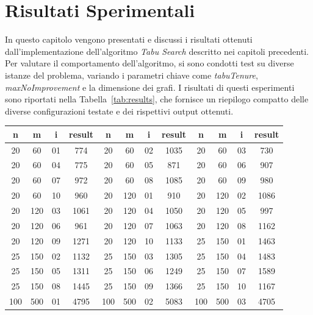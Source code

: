 \section{Risultati Sperimentali}
\label{sec:Risultati}

In questo capitolo vengono presentati e discussi i risultati ottenuti dall'implementazione dell'algoritmo \emph{Tabu Search} descritto nei capitoli precedenti. Per valutare il comportamento dell’algoritmo, si sono condotti test su diverse istanze del problema, variando i parametri chiave come \emph{tabuTenure}, \emph{maxNoImprovement} e la dimensione dei grafi. I risultati di questi esperimenti sono riportati nella Tabella~\ref{tab:results}, che fornisce un riepilogo compatto delle diverse configurazioni testate e dei rispettivi output ottenuti.

\begin{table}[h]
    \centering
    \small
    \renewcommand{\arraystretch}{1.2}
    \begin{tabular}{cccc||cccc||cccc}
        \toprule
        \textbf{n} & \textbf{m} & \textbf{i} & \textbf{result} & \textbf{n} & \textbf{m} & \textbf{i} & \textbf{result} & \textbf{n} & \textbf{m} & \textbf{i} & \textbf{result} \\
        \midrule
        20 & 60  & 01 & 774  & 20 & 60  & 02 & 1035 & 20 & 60  & 03 & 730  \\
        20 & 60  & 04 & 775  & 20 & 60  & 05 & 871  & 20 & 60  & 06 & 907  \\
        20 & 60  & 07 & 972  & 20 & 60  & 08 & 1085 & 20 & 60  & 09 & 980  \\
        20 & 60  & 10 & 960  & 20 & 120 & 01 & 910  & 20 & 120 & 02 & 1086 \\
        20 & 120 & 03 & 1061 & 20 & 120 & 04 & 1050 & 20 & 120 & 05 & 997  \\
        20 & 120 & 06 & 961  & 20 & 120 & 07 & 1063 & 20 & 120 & 08 & 1162 \\
        20 & 120 & 09 & 1271 & 20 & 120 & 10 & 1133 & 25 & 150 & 01 & 1463 \\
        25 & 150 & 02 & 1132 & 25 & 150 & 03 & 1305 & 25 & 150 & 04 & 1483 \\
        25 & 150 & 05 & 1311 & 25 & 150 & 06 & 1249 & 25 & 150 & 07 & 1589 \\
        25 & 150 & 08 & 1445 & 25 & 150 & 09 & 1366 & 25 & 150 & 10 & 1167 \\
        \hline\hline
        100 & 500  & 01 & 4795 & 100 & 500  & 02 & 5083 & 100 & 500  & 03 & 4705 \\

\end{tabular}
\end{table}
